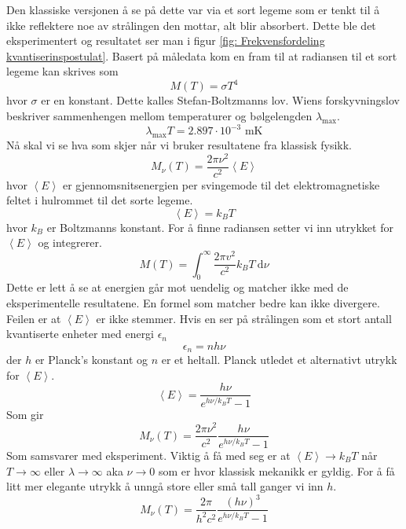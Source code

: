 Den klassiske versjonen å se på dette var via et sort legeme som er tenkt til å ikke reflektere noe av strålingen den mottar, alt blir absorbert. Dette ble det eksperimentert og resultatet ser man i figur \ref{fig: Frekvensfordeling kvantiserinspostulat}. 
Basert på måledata kom en fram til at radiansen til et sort legeme kan skrives som 
\begin{equation}
M(T) = σT^{4}
\end{equation}
hvor $σ$ er en konstant. Dette kalles Stefan-Boltzmanns lov. Wiens forskyvningslov beskriver sammenhengen mellom temperaturer og bølgelengden $λ_{\text{max}}$. 
\begin{equation}
λ_{\text{max}}T = 2.897 ⋅ 10^{-3} \text{ mK}
\end{equation}
Nå skal vi se hva som skjer når vi bruker resultatene fra klassisk fysikk. 
\begin{equation}
M_{ν}(T) = \frac{2 π ν^{2}}{c^{2}} \left< E \right>
\end{equation}
hvor $\left< E \right>$ er gjennomsnitsenergien per svingemode til det elektromagnetiske feltet i hulrommet til det sorte legeme. 
\begin{equation}
\left< E \right> = k_{B}T
\end{equation}
hvor $k_{B}$ er Boltzmanns konstant. For å finne radiansen setter vi inn utrykket for $\left< E \right>$ og integrerer. 
\begin{equation}
M(T) = \int_{0}^{∞} \frac{2 π v^{2}}{c^{2}} k_{B}T \ \mathrm{d}ν
\end{equation}
Dette er lett å se at energien går mot uendelig og matcher ikke med de eksperimentelle resultatene. En formel som matcher bedre kan ikke divergere. Feilen er at $\left< E \right>$ er ikke stemmer. Hvis en ser på strålingen som et stort antall kvantiserte enheter med energi $ϵ_{n}$
\begin{equation}
ϵ_{n} = nhν
\end{equation}
der $h$ er Planck's konstant og $n$ er et heltall. Planck utledet et alternativt utrykk for $\left< E \right>$. 
\begin{equation}
\left< E \right> = \frac{hν}{e^{hν/k_{B}T} - 1}
\end{equation}
Som gir
\begin{equation}
M_{ν}(T) = \frac{2 π ν^{2}}{c^{2}} \frac{hν}{e^{hν/k_{B}T} - 1}
\end{equation}
Som samsvarer med eksperiment. Viktig å få med seg er at $\left< E \right> → k_{B}T$ når $T → ∞$ eller $λ → \infty$ aka $ν → 0$ som er hvor klassisk mekanikk er gyldig.
For å få litt mer elegante utrykk å unngå store eller små tall ganger vi inn $h$. 
\begin{equation}
M_{ν}(T) = \frac{2π}{h^{2}c^{2}} \frac{(hν)^{3}}{e^{h ν/k_{B}T} - 1}
\end{equation}

